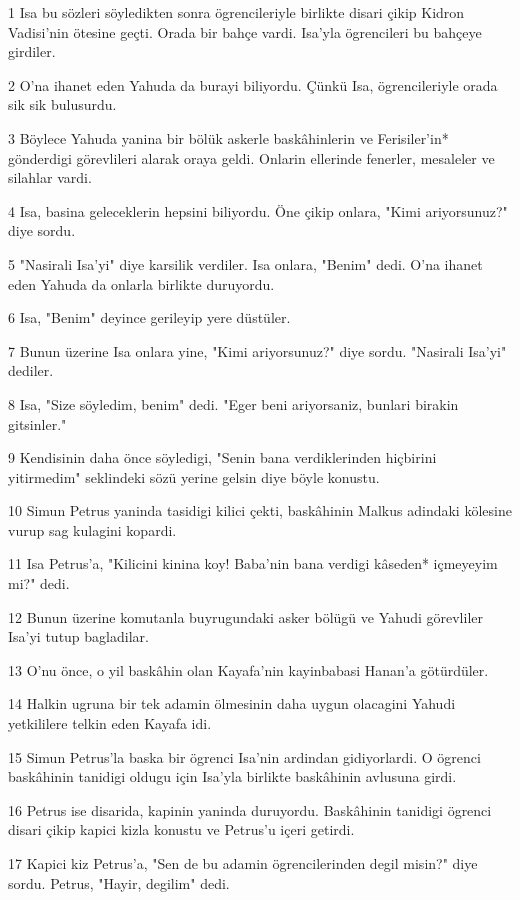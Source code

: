 \par 1 Isa bu sözleri söyledikten sonra ögrencileriyle birlikte disari çikip Kidron Vadisi'nin ötesine geçti. Orada bir bahçe vardi. Isa'yla ögrencileri bu bahçeye girdiler.
\par 2 O'na ihanet eden Yahuda da burayi biliyordu. Çünkü Isa, ögrencileriyle orada sik sik bulusurdu.
\par 3 Böylece Yahuda yanina bir bölük askerle baskâhinlerin ve Ferisiler'in* gönderdigi görevlileri alarak oraya geldi. Onlarin ellerinde fenerler, mesaleler ve silahlar vardi.
\par 4 Isa, basina geleceklerin hepsini biliyordu. Öne çikip onlara, "Kimi ariyorsunuz?" diye sordu.
\par 5 "Nasirali Isa'yi" diye karsilik verdiler. Isa onlara, "Benim" dedi. O'na ihanet eden Yahuda da onlarla birlikte duruyordu.
\par 6 Isa, "Benim" deyince gerileyip yere düstüler.
\par 7 Bunun üzerine Isa onlara yine, "Kimi ariyorsunuz?" diye sordu. "Nasirali Isa'yi" dediler.
\par 8 Isa, "Size söyledim, benim" dedi. "Eger beni ariyorsaniz, bunlari birakin gitsinler."
\par 9 Kendisinin daha önce söyledigi, "Senin bana verdiklerinden hiçbirini yitirmedim" seklindeki sözü yerine gelsin diye böyle konustu.
\par 10 Simun Petrus yaninda tasidigi kilici çekti, baskâhinin Malkus adindaki kölesine vurup sag kulagini kopardi.
\par 11 Isa Petrus'a, "Kilicini kinina koy! Baba'nin bana verdigi kâseden* içmeyeyim mi?" dedi.
\par 12 Bunun üzerine komutanla buyrugundaki asker bölügü ve Yahudi görevliler Isa'yi tutup bagladilar.
\par 13 O'nu önce, o yil baskâhin olan Kayafa'nin kayinbabasi Hanan'a götürdüler.
\par 14 Halkin ugruna bir tek adamin ölmesinin daha uygun olacagini Yahudi yetkililere telkin eden Kayafa idi.
\par 15 Simun Petrus'la baska bir ögrenci Isa'nin ardindan gidiyorlardi. O ögrenci baskâhinin tanidigi oldugu için Isa'yla birlikte baskâhinin avlusuna girdi.
\par 16 Petrus ise disarida, kapinin yaninda duruyordu. Baskâhinin tanidigi ögrenci disari çikip kapici kizla konustu ve Petrus'u içeri getirdi.
\par 17 Kapici kiz Petrus'a, "Sen de bu adamin ögrencilerinden degil misin?" diye sordu. Petrus, "Hayir, degilim" dedi.
